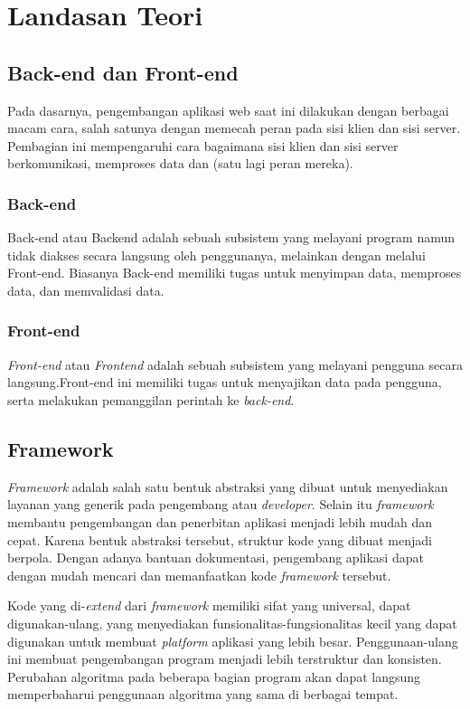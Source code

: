 \chapter{Landasan Teori}
\label{chap:teori}

\section{Back-end dan Front-end}
    Pada dasarnya, pengembangan aplikasi web saat ini dilakukan dengan
    berbagai macam cara, salah satunya dengan memecah peran pada sisi klien
    dan sisi server. Pembagian ini mempengaruhi cara bagaimana sisi klien
    dan sisi server berkomunikasi, memproses data dan (satu lagi peran
    mereka).

\subsection{Back-end}
    Back-end atau Backend adalah sebuah subsistem yang melayani program
    namun tidak diakses secara langsung oleh penggunanya, melainkan dengan
    melalui Front-end\cite{oxford:definition-backend}. Biasanya Back-end
    memiliki tugas untuk menyimpan data, memproses data, dan memvalidasi
    data.

\subsection{Front-end}
    \textit{Front-end} atau \textit{Frontend} adalah sebuah subsistem yang melayani pengguna secara langsung\cite{oxford:definition-frontend}.Front-end ini memiliki tugas untuk menyajikan data pada pengguna, serta melakukan pemanggilan perintah ke \textit{back-end}.


\section{Framework}
    \textit{Framework} adalah salah satu bentuk abstraksi yang dibuat untuk
    menyediakan layanan yang generik pada pengembang atau \emph{developer}. Selain itu \textit{framework} membantu pengembangan dan penerbitan aplikasi menjadi lebih mudah dan cepat. 
    Karena bentuk abstraksi tersebut, struktur kode yang dibuat menjadi berpola. Dengan adanya bantuan dokumentasi, pengembang aplikasi dapat dengan mudah mencari dan memanfaatkan kode \textit{framework} tersebut.
    
    
    Kode yang di-\textit{extend} dari \textit{framework} memiliki sifat yang universal, dapat digunakan-ulang, yang menyediakan funsionalitas-fungsionalitas kecil yang dapat digunakan untuk membuat \textit{platform} aplikasi yang lebih besar. 
    Penggunaan-ulang ini membuat pengembangan program menjadi lebih terstruktur dan konsisten. Perubahan algoritma pada beberapa bagian program akan dapat langsung memperbaharui penggunaan algoritma yang sama di berbagai tempat.
    
